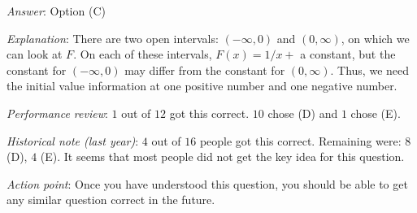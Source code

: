 \documentclass[10pt]{amsart}
\begin{document}
\begin{enumerate}
  {\em Answer}: Option (C)

  {\em Explanation}: There are two open intervals: $(-\infty,0)$ and
  $(0,\infty)$, on which we can look at $F$. On each of these
  intervals, $F(x) = 1/x + $ a constant, but the constant for
  $(-\infty,0)$ may differ from the constant for $(0,\infty)$. Thus,
  we need the initial value information at one positive number and one
  negative number.

  {\em Performance review}: $1$ out of $12$ got this correct. $10$
  chose (D) and $1$ chose (E).

  {\em Historical note (last year)}: $4$ out of $16$ people got this
  correct. Remaining were: $8$ (D), $4$ (E). It seems that most people
  did not get the key idea for this question.

  {\em Action point}: Once you have understood this question, you
  should be able to get any similar question correct in the future.

\end{enumerate}
\end{document}
